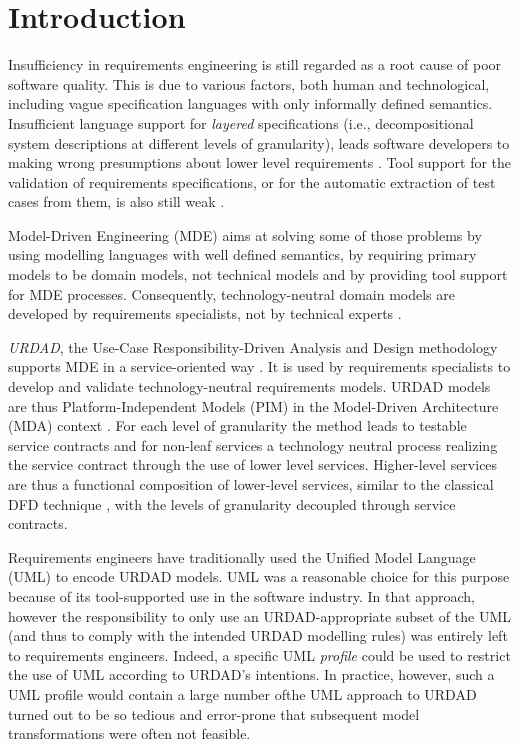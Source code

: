 \section{Introduction}
Insufficiency in requirements engineering is still regarded as a root cause of poor software quality. This is due to various factors, both human and technological, including vague specification languages with only informally defined semantics. Insufficient language support for \emph{layered} specifications (i.e., decompositional system descriptions at different levels of granularity), leads software developers to making wrong presumptions about lower level requirements \cite{espana_evaluating_2009}. Tool support for the validation of requirements specifications, or for the automatic extraction of test cases from them, is also still weak \cite{bashardoust-tajali_extracting_2008}.

Model-Driven Engineering (MDE) \cite{schmidt_model_2006} aims at solving some of those problems by using modelling languages with well defined semantics, by requiring primary models to be domain models, not technical models \cite{asnina_computation_2010} and by providing tool support for MDE processes. Consequently, technology-neutral domain models are developed by requirements specialists, not by technical experts \cite{asnina_computation_2010}.

\emph{URDAD}, the Use-Case Responsibility-Driven Analysis and Design methodology \cite{fritz_solms_technology_2007} supports MDE in a service-oriented way \cite{solms_urdad_2010}. It is used by requirements specialists to develop and validate technology-neutral requirements models. URDAD models are thus Platform-Independent Models (PIM) in the Model-Driven Architecture (MDA) context \cite{solms_urdad_2010}. For each level of granularity the method leads to testable service contracts and for non-leaf services a technology neutral process realizing the service contract through the use of lower level services. Higher-level services are thus a functional composition of lower-level services, similar to the classical DFD technique \cite{demarco_tom_structured_1978}, with the levels of granularity decoupled through service contracts.

Requirements engineers have traditionally used the Unified Model Language (UML) to encode URDAD models. UML was a reasonable choice for this purpose because of its tool-supported use in the software industry. In that approach, however the responsibility to only use an URDAD-appropriate subset of the UML (and thus to comply with the intended URDAD modelling rules) was entirely left to requirements engineers. Indeed, a specific UML \emph{profile} could be used to restrict the use of UML according to URDAD's intentions. In practice, however, such a UML profile would contain a large number ofthe UML approach to URDAD turned out to be so tedious and error-prone that subsequent model transformations were often not feasible.


